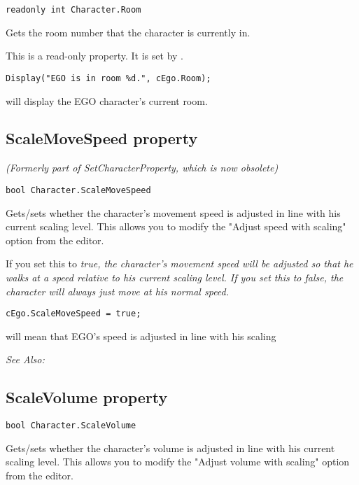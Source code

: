 \begin{verbatim}
readonly int Character.Room
\end{verbatim}
Gets the room number that the character is currently in.

This is a read-only property. It is set by .

\begin{verbatim}
Display("EGO is in room %d.", cEgo.Room);
\end{verbatim}
will display the EGO character's current room.


\subsection{ScaleMoveSpeed property}\label{Character.ScaleMoveSpeed}%

\it{(Formerly part of SetCharacterProperty, which is now obsolete)}

\begin{verbatim}
bool Character.ScaleMoveSpeed
\end{verbatim}
Gets/sets whether the character's movement speed is adjusted in line with his
current scaling level. This allows you to modify the "Adjust speed with scaling" option
from the editor.

If you set this to \it{true}, the character's movement speed will be adjusted so that he walks
at a speed relative to his current scaling level. If you set this to \it{false}, the character
will always just move at his normal speed.

\begin{verbatim}
cEgo.ScaleMoveSpeed = true;
\end{verbatim}
will mean that EGO's speed is adjusted in line with his scaling

\it{See Also:} 


\subsection{ScaleVolume property}\label{Character.ScaleVolume}%

\begin{verbatim}
bool Character.ScaleVolume
\end{verbatim}
Gets/sets whether the character's volume is adjusted in line with his
current scaling level. This allows you to modify the "Adjust volume with scaling" option
from the editor.

